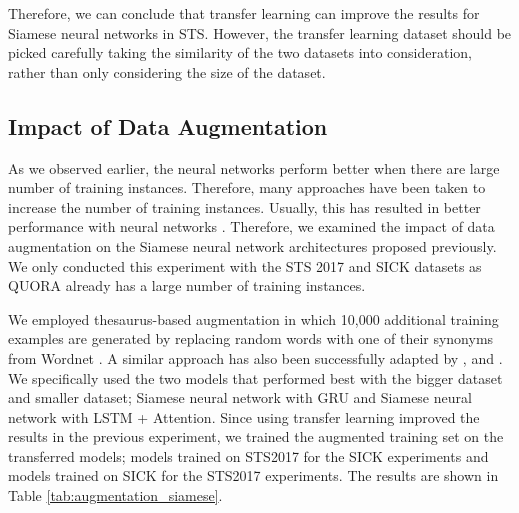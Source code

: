 Therefore, we can conclude that transfer learning can improve the results for Siamese neural networks in STS. However, the transfer learning dataset should be picked carefully taking the similarity of the two datasets into consideration, rather than only considering the size of the dataset.


\subsection{Impact of Data Augmentation}
\label{sec:siamese_aug}
As we observed earlier, the neural networks perform better when there are large number of training instances. Therefore, many approaches have been taken to increase the number of training instances. Usually, this has resulted in better performance with neural networks \autocite{wei-zou-2019-eda}. Therefore, we examined the impact of data augmentation on the Siamese neural network architectures proposed previously. We only conducted this experiment with the STS 2017 and SICK datasets as QUORA already has a large number of training instances.

We employed thesaurus-based augmentation in which 10,000 additional training examples are generated by replacing random words with one of their synonyms from Wordnet \autocite{10.1145/219717.219748}. A similar approach has also been successfully adapted by \textcite{Mueller_Thyagarajan_2016}, and \textcite{10.5555/2969239.2969312}.  We specifically used the two models that performed best with the bigger dataset and smaller dataset; Siamese neural network with GRU and Siamese neural network with LSTM + Attention. Since using transfer learning improved the results in the previous experiment, we trained the augmented training set on the transferred models; models trained on STS2017 for the SICK experiments and models trained on SICK for the STS2017 experiments. The results are shown in Table \ref{tab:augmentation_siamese}.  


